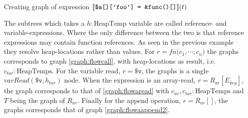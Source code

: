 \begin{graph}
\begin{adjustbox}{max size={.33\textwidth}{.33\textheight}}
\begin{tikzpicture}[node distance = 2cm, auto]
\end{tikzpicture}\end{adjustbox}
\begin{adjustbox}{max size={.33\textwidth}{.33\textheight}}\end{adjustbox}
\caption{Creating graph of expression $\subt{\texttt{\$a[]['foo']  = \&func()[]}}(t)$}
\label{graph:exassign}
\end{graph}

The subtrees which takes a $h : \text{HeapTemp}$ variable are called reference- and variable-expressions. Where the only difference between the two is that reference expressions may contain function references. As seen in the previous example they resolve heap-locations rather than values. For $r = \mathit{fn} \texttt{(}c_1, \cdots, c_n\texttt{)}$ the graphs corresponds to graph \ref{graph:flowcall}, with heap-locations as result, i.e. $c_{tar} : \text{HeapTemps}$. For the variable read, $r = \texttt{\$v}$, the graphs is a single $\mathit{varRead}(\texttt{\$v}, h_{tar})$ node. When the expression is an array-read, $r= R_{ar}[E_{key}]$, the graph corresponds to that of \ref{graph:flowaread} with $c_{ar},c_{tar} : \text{HeapTemps}$ and $T$ being the graph of $R_{ar}$. Finally for the append operation, $r = R_{ar}[]$, the graphs corresponds that of graph \ref{graph:flowaappend2}.